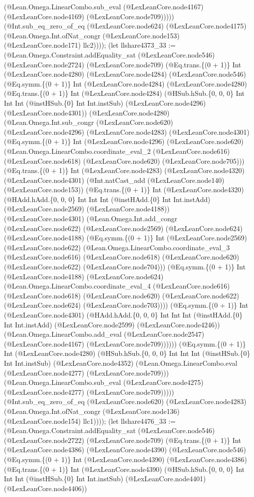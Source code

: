 \documentclass[11pt]{article}
\begin{document}
(@Lean.Omega.LinearCombo.sub\_eval (@LexLeanCore.node4167) (@LexLeanCore.node4169) (@LexLeanCore.node709))))) (@Int.sub\_eq\_zero\_of\_eq (@LexLeanCore.node624) (@LexLeanCore.node4175) (@Lean.Omega.Int.ofNat\_congr (@LexLeanCore.node153) (@LexLeanCore.node171) llc2)))); (let llshare4373\_33 := (@Lean.Omega.Constraint.addEquality\_sat (@LexLeanCore.node546) (@LexLeanCore.node2724) (@LexLeanCore.node709) (@Eq.trans.\{(0 + 1)\} Int (@LexLeanCore.node4280) (@LexLeanCore.node4284) (@LexLeanCore.node546) (@Eq.symm.\{(0 + 1)\} Int (@LexLeanCore.node4284) (@LexLeanCore.node4280) (@Eq.trans.\{(0 + 1)\} Int (@LexLeanCore.node4284) (@HSub.hSub.\{0, 0, 0\} Int Int Int (@instHSub.\{0\} Int Int.instSub) (@LexLeanCore.node4296) (@LexLeanCore.node4301)) (@LexLeanCore.node4280) (@Lean.Omega.Int.sub\_congr (@LexLeanCore.node620) (@LexLeanCore.node4296) (@LexLeanCore.node4283) (@LexLeanCore.node4301) (@Eq.symm.\{(0 + 1)\} Int (@LexLeanCore.node4296) (@LexLeanCore.node620) (@Lean.Omega.LinearCombo.coordinate\_eval\_2 (@LexLeanCore.node616) (@LexLeanCore.node618) (@LexLeanCore.node620) (@LexLeanCore.node705))) (@Eq.trans.\{(0 + 1)\} Int (@LexLeanCore.node4283) (@LexLeanCore.node4320) (@LexLeanCore.node4301) (@Int.natCast\_add (@LexLeanCore.node140) (@LexLeanCore.node153)) (@Eq.trans.\{(0 + 1)\} Int (@LexLeanCore.node4320) (@HAdd.hAdd.\{0, 0, 0\} Int Int Int (@instHAdd.\{0\} Int Int.instAdd) (@LexLeanCore.node2569) (@LexLeanCore.node4188)) (@LexLeanCore.node4301) (@Lean.Omega.Int.add\_congr (@LexLeanCore.node622) (@LexLeanCore.node2569) (@LexLeanCore.node624) (@LexLeanCore.node4188) (@Eq.symm.\{(0 + 1)\} Int (@LexLeanCore.node2569) (@LexLeanCore.node622) (@Lean.Omega.LinearCombo.coordinate\_eval\_3 (@LexLeanCore.node616) (@LexLeanCore.node618) (@LexLeanCore.node620) (@LexLeanCore.node622) (@LexLeanCore.node704))) (@Eq.symm.\{(0 + 1)\} Int (@LexLeanCore.node4188) (@LexLeanCore.node624) (@Lean.Omega.LinearCombo.coordinate\_eval\_4 (@LexLeanCore.node616) (@LexLeanCore.node618) (@LexLeanCore.node620) (@LexLeanCore.node622) (@LexLeanCore.node624) (@LexLeanCore.node703)))) (@Eq.symm.\{(0 + 1)\} Int (@LexLeanCore.node4301) (@HAdd.hAdd.\{0, 0, 0\} Int Int Int (@instHAdd.\{0\} Int Int.instAdd) (@LexLeanCore.node2599) (@LexLeanCore.node4246)) (@Lean.Omega.LinearCombo.add\_eval (@LexLeanCore.node2547) (@LexLeanCore.node4167) (@LexLeanCore.node709)))))) (@Eq.symm.\{(0 + 1)\} Int (@LexLeanCore.node4280) (@HSub.hSub.\{0, 0, 0\} Int Int Int (@instHSub.\{0\} Int Int.instSub) (@LexLeanCore.node4352) (@Lean.Omega.LinearCombo.eval (@LexLeanCore.node4277) (@LexLeanCore.node709))) (@Lean.Omega.LinearCombo.sub\_eval (@LexLeanCore.node4275) (@LexLeanCore.node4277) (@LexLeanCore.node709))))) (@Int.sub\_eq\_zero\_of\_eq (@LexLeanCore.node620) (@LexLeanCore.node4283) (@Lean.Omega.Int.ofNat\_congr (@LexLeanCore.node136) (@LexLeanCore.node154) llc1)))); (let llshare4476\_33 := (@Lean.Omega.Constraint.addEquality\_sat (@LexLeanCore.node546) (@LexLeanCore.node2722) (@LexLeanCore.node709) (@Eq.trans.\{(0 + 1)\} Int (@LexLeanCore.node4386) (@LexLeanCore.node4390) (@LexLeanCore.node546) (@Eq.symm.\{(0 + 1)\} Int (@LexLeanCore.node4390) (@LexLeanCore.node4386) (@Eq.trans.\{(0 + 1)\} Int (@LexLeanCore.node4390) (@HSub.hSub.\{0, 0, 0\} Int Int Int (@instHSub.\{0\} Int Int.instSub) (@LexLeanCore.node4401) (@LexLeanCore.node4406)) 
\end{document}
